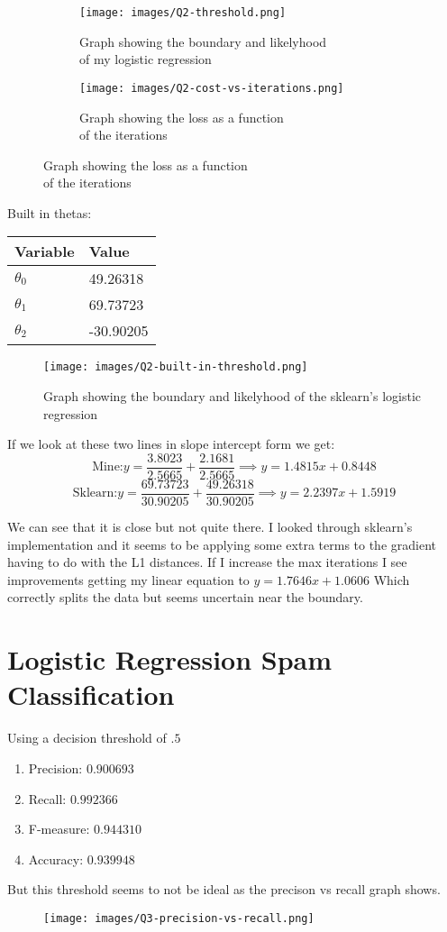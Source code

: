 \documentclass[12pt]{article}
\begin{document}
\begin{figure}[h]
\centering
\begin{subfigure}{.5\textwidth}
    \centering
    \texttt{[image: images/Q2-threshold.png]}
    \caption{Graph showing the boundary and likelyhood\\ of my logistic regression}
\end{subfigure}%
\begin{subfigure}{.5\textwidth}
    \centering
    \texttt{[image: images/Q2-cost-vs-iterations.png]}
    \caption{Graph showing the loss as a function\\ of the iterations}
\end{subfigure}
\end{figure}

Built in thetas:
\begin{tabular}{|l|l|}
\hline
Variable   & Value  \\
\hline
$\theta_0$ &  49.26318 \\
$\theta_1$ &  69.73723 \\
$\theta_2$ & -30.90205 \\
\hline
\end{tabular}

\begin{figure}[h]
    \centering
    \texttt{[image: images/Q2-built-in-threshold.png]}
    \caption{Graph showing the boundary and likelyhood of the sklearn's logistic regression}
\end{figure}
If we look at these two lines in slope intercept form we get:
$$ \text{Mine:} y = \frac{3.8023}{2.5665} + \frac{2.1681}{2.5665} \implies y = 1.4815x + 0.8448$$
$$ \text{Sklearn:} y = \frac{69.73723}{30.90205} + \frac{49.26318}{30.90205} \implies y = 2.2397x + 1.5919$$

We can see that it is close but not quite there.
I looked through sklearn's implementation and it seems to be applying some extra terms to the gradient having to do with the L1 distances.
If I increase the max iterations I see improvements getting my linear equation to $ y = 1.7646x + 1.0606$
Which correctly splits the data but seems uncertain near the boundary.

\newpage
\section{Logistic Regression Spam Classification}
Using a decision threshold of $.5$
\begin{enumerate}
    \item Precision: $0.900693$
    \item Recall:    $0.992366$
    \item F-measure: $0.944310$
    \item Accuracy:  $0.939948$
\end{enumerate}
But this threshold seems to not be ideal as the precison vs recall graph shows.
\begin{figure}[h]
\centering
\texttt{[image: images/Q3-precision-vs-recall.png]}
\end{figure}
\end{document}
